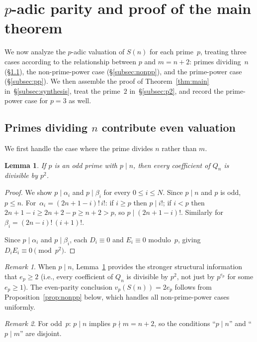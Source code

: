 \documentclass[10pt]{amsart}
\newtheorem{lemma}[theorem]{Lemma}
\theoremstyle{definition}
\theoremstyle{remark}
\newtheorem*{remark}{Remark}
\begin{document}
\section{$p$-adic parity and proof of the main theorem}\label{sec:padic}

We now analyze the $p$-adic valuation of $S(n)$ for each prime~$p$,
treating three cases according to the relationship between $p$ and
$m = n+2$: primes dividing~$n$ (\S\ref{subsec:pdivn}), the non-prime-power
case (\S\ref{subsec:nonpp}), and the prime-power case (\S\ref{subsec:pp}).
We then assemble the proof of Theorem~\ref{thm:main} in~\S\ref{subsec:synthesis},
treat the prime~$2$ in~\S\ref{subsec:p2}, and record the prime-power case for
$p=3$ as well.

\subsection{Primes dividing $n$ contribute even valuation}\label{subsec:pdivn}

We first handle the case where the prime divides $n$ rather than $m$.

\begin{lemma}\label{lem:Qnmodp}
If $p$ is an odd prime with $p \mid n$, then every coefficient of
$Q_n$ is divisible by $p^2$.
\end{lemma}

\begin{proof}
We show $p \mid \alpha_i$ and $p \mid \beta_i$ for every $0 \le i \le N$.
Since $p \mid n$ and $p$ is odd, $p \le n$.  For~$\alpha_i = (2n+1-i)!\,i!$:
if $i \ge p$ then $p \mid i!$; if $i < p$ then $2n+1-i \ge 2n+2-p \ge n+2 > p$,
so $p \mid (2n+1-i)!$.  Similarly for $\beta_i = (2n-i)!\,(i+1)!$.

Since $p \mid \alpha_i$ and $p \mid \beta_i$, each $D_i \equiv 0$ and
$E_i \equiv 0$ modulo~$p$, giving $D_i E_i \equiv 0 \pmod{p^2}$.
\end{proof}

\begin{remark}\label{rem:pdivn}
When $p \mid n$, Lemma~\ref{lem:Qnmodp} provides the stronger structural
information that $e_p \ge 2$ (i.e., every coefficient of $Q_n$ is
divisible by $p^2$, not just by $p^{e_p}$ for some $e_p \ge 1$).
The even-parity conclusion $v_p(S(n)) = 2e_p$ follows from
Proposition~\ref{prop:nonpp} below, which handles all non-prime-power
cases uniformly.
\end{remark}

\begin{remark}
For odd~$p$: $p \mid n$ implies $p \nmid m = n+2$, so the conditions
``$p \mid n$'' and ``$p \mid m$'' are disjoint.
\end{remark}
\end{document}
